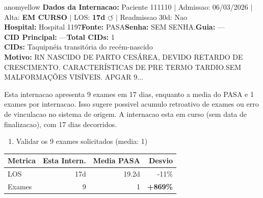 \documentclass[a4paper,10pt]{article}
\begin{document}
\begin{anomalycard}[Internacao 185366 | PASA | MODERADO (z=2.66)]{anomyellow}
\textbf{Dados da Internacao:} Paciente 111110 $\mid$ Admissao: 06/03/2026 $\mid$ Alta: \textcolor{anomorange}{\textbf{EM CURSO}} $\mid$ LOS: \textbf{17d \textcolor{anomorange}{$\circlearrowleft$}} $\mid$ Readmissao 30d: Nao\\
\textbf{Hospital:} Hospital 1197\quad\textbf{Fonte:} PASA\quad\textbf{Senha:} SEM SENHA.\quad\textbf{Guia:} ---\\
\textbf{CID Principal:} {\small ---}\quad\textbf{Total CIDs:} 1\\

\textbf{CIDs:} {\scriptsize Taquipnéia transitória do recém-nascido}\\

\textbf{Motivo:} {\scriptsize RN NASCIDO DE PARTO CESÁREA, DEVIDO RETARDO DE CRESCIMENTO. CARACTERÍSTICAS DE PRE TERMO TARDIO.SEM MALFORMAÇÕES VISÍVEIS. APGAR 9...}\\

\vspace{2pt}\begin{tcolorbox}[colback=severityred!20,colframe=anomyellow,title={\textbf{Interpretacao de Negocio}},fonttitle=\bfseries\small,left=4pt,right=4pt,top=3pt,bottom=3pt]
{\small Esta internacao apresenta 9 exames em 17 dias, enquanto a media do PASA e 1 exames por internacao. Isso sugere possivel acumulo retroativo de exames ou erro de vinculacao no sistema de origem. A internacao esta em curso (sem data de finalizacao), com 17 dias decorridos.}
\end{tcolorbox}
\begin{tcolorbox}[colback=severityyellow!30,colframe=anomorange,title={\textbf{Recomendacoes Especificas}},fonttitle=\bfseries\small,left=4pt,right=4pt,top=3pt,bottom=3pt]
\begin{enumerate}[nosep,leftmargin=16pt]
\item {\small Validar os 9 exames solicitados (media: 1)}
\end{enumerate}
\end{tcolorbox}
\begin{center}\begin{tabular}{l r r r}\toprule\textbf{Metrica} & \textbf{Esta Intern.} & \textbf{Media PASA} & \textbf{Desvio} \\\midrule
LOS & 17d & 19.2d & -11\% \\
Exames & 9 & 1 & \textcolor{anomred}{\textbf{+869\%}} \\
\bottomrule\end{tabular}\end{center}


\end{anomalycard}
\end{document}
